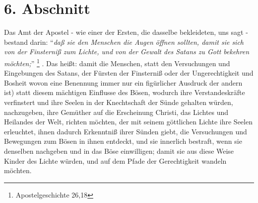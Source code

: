 \section{6. Abschnitt}  \label{kap2_ab6}

Das Amt der Apostel - wie einer der Ersten, die dasselbe bekleideten, uns sagt -
bestand darin: "`\textit{daß sie den Menschen die Augen öffnen sollten, damit sie
sich von der Finsterniß zum Lichte, und von der Gewalt des Satans zu Gott bekehren
möchten;}"' \footnote{Apostelgeschichte 26,18}
.
Das heißt: damit die Menschen, statt den 
Versuchungen und Eingebungen des Satans,  der Fürsten der
Finsterniß oder der Ungerechtigkeit und Bosheit  wovon eine Benennung immer nur
ein figürlicher Ausdruck der andern ist) statt diesem mächtigen Einflusse des
Bösen, wodurch ihre Verstandeskräfte verfinstert und ihre Seelen in der
Knechtschaft der Sünde gehalten würden, nachzugeben, ihre Gemüther auf die
Erscheinung Christi, das Lichtes und Heilandes der Welt, richten möchten, der
mit seinem göttlichen Lichte ihre Seelen erleuchtet, ihnen dadurch Erkenntniß
ihrer Sünden giebt, die Versuchungen und Bewegungen zum Bösen in ihnen entdeckt,
und sie innerlich bestraft, wenn sie denselben nachgeben und in das Böse
einwilligen; damit sie aus diese Weise Kinder des Lichte würden, und auf dem
Pfade der Gerechtigkeit wandeln möchten.

\medskip 

